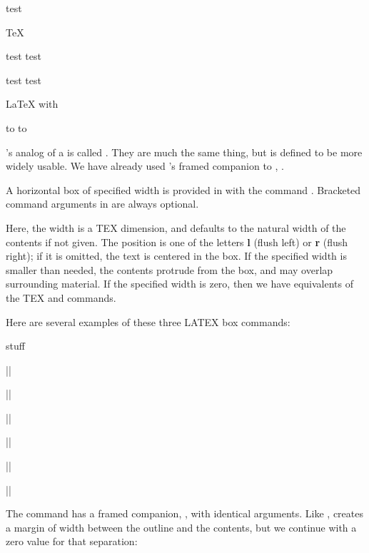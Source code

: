 {\begin{texexample}{}{}
 \mbox{test}

TeX

\hbox{test} \hbox{test}

\indent\hbox{test} \hbox{test}

LaTeX with 

\makeatletter
\leavevmode\hbox to \wd{} \indent\hbox to \wd{}
\makeatother
\end{texexample}



\latex's analog of a is called . They are 
much the same thing, but  is defined to be more widely usable. We have already used \latex's framed companion to , .

A horizontal box of specified width is provided in \latex with the command
. Bracketed command arguments
in \latex are always optional. 

Here, the width is a TEX dimension,
and defaults to the natural width of the contents if not given. The position
is one of the letters \textbf{l} (flush left) or \textbf{r} (flush right); if it is omitted, the text
is centered in the box. If the specified width is smaller than needed, the
contents protrude from the box, and may overlap surrounding material. If
the specified width is zero, then we have equivalents of the TEX  and
 commands.


Here are several examples of these three LATEX box commands:

{\obeylines
\mbox{stuff}


||

||

||

||

||

||
}


The  command has a framed companion, , with identical
arguments. Like ,  creates a margin of width 
between the outline and the contents, but we continue with a zero value for
that separation:





}
